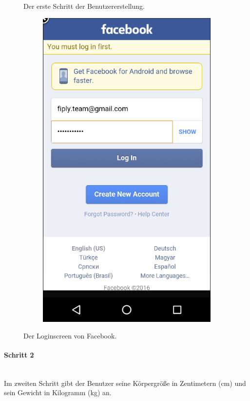\documentclass[FIPLY_base.tex]{subfiles}
\begin{document}
\begin{figure}[H]
\begin{subfigure}[b]{0.3\textwidth}
	\end{subfigure}
	\hfil
	\caption{Der erste Schritt der Benutzererstellung.}
	\begin{subfigure}[b]{0.3\textwidth}
	\includegraphics[scale=0.55]{img/User_facebooklogin}
	\end{subfigure}
	\hfil
	\caption{Der Loginscreen von Facebook.}
	
\end{figure}
\newpage
\paragraph{Schritt 2}\ \\
Im zweiten Schritt gibt der Benutzer seine Körpergröße in Zentimetern (cm) und sein Gewicht in Kilogramm (kg) an.
\end{document}
